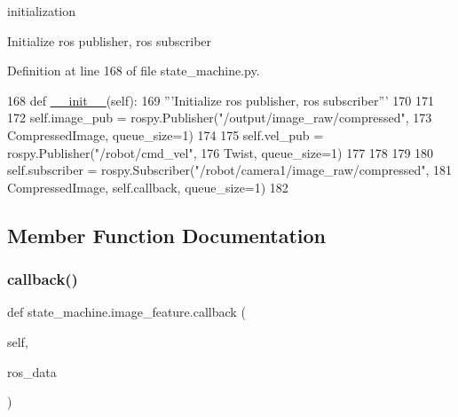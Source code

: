 initialization 

\begin{DoxyVerb}Initialize ros publisher, ros subscriber\end{DoxyVerb}
 

Definition at line 168 of file state\+\_\+machine.\+py.


\begin{DoxyCode}
168     \textcolor{keyword}{def }\hyperlink{classstate__machine_1_1Play_a5993a23d8be7f7b2647f71ede0334957}{\_\_init\_\_}(self):
169         \textcolor{stringliteral}{'''Initialize ros publisher, ros subscriber'''}
170 
171         
172         self.image\_pub = rospy.Publisher(\textcolor{stringliteral}{"/output/image\_raw/compressed"},
173                                          CompressedImage, queue\_size=1)
174 
175         self.vel\_pub = rospy.Publisher(\textcolor{stringliteral}{"/robot/cmd\_vel"},
176                                        Twist, queue\_size=1)
177  
178 
179         
180         self.subscriber = rospy.Subscriber(\textcolor{stringliteral}{"/robot/camera1/image\_raw/compressed"},
181                                            CompressedImage, self.callback,  queue\_size=1)
182 
\end{DoxyCode}


\subsection{Member Function Documentation}
\mbox{\label{classstate__machine_1_1image__feature_a18e75f60a2a7f566add766b5f892c6f5}} 
\subsubsection{\texorpdfstring{callback()}{callback()}\hspace{0.1cm}{\footnotesize\ttfamily [1/2]}}
{\footnotesize\ttfamily def state\+\_\+machine.\+image\+\_\+feature.\+callback (\begin{DoxyParamCaption}\item[{}]{self,  }\item[{}]{ros\+\_\+data }\end{DoxyParamCaption})}



